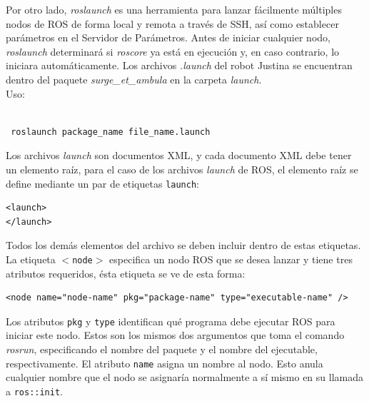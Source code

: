 \documentclass[user_manual.tex]{subfiles}
\begin{document}
Por otro lado, \textit{roslaunch} es una herramienta para lanzar fácilmente múltiples nodos de ROS de forma local y remota a través de SSH, así como establecer parámetros en el Servidor de Parámetros. Antes de iniciar cualquier nodo, \textit{roslaunch} determinará si \textit{roscore} ya está en ejecución y, en caso contrario, lo iniciara automáticamente. Los archivos \textit{.launch} del robot Justina se encuentran dentro del paquete \textit{surge\_et\_ambula} en la carpeta \textit{launch}.\\

Uso:\\\\
\begin{verbatim}
 roslaunch package_name file_name.launch
\end{verbatim}

Los archivos \textit{launch} son documentos XML, y cada documento XML debe tener un elemento raíz, para el caso de los archivos \textit{launch} de ROS, el elemento raíz se define mediante un par de etiquetas \texttt{launch}:

\begin{verbatim}
<launch>
</launch>
\end{verbatim}

Todos los demás elementos del archivo se deben incluir dentro de estas etiquetas.\\

La etiqueta \texttt{$ < $node$ > $} especifica un nodo ROS que se desea lanzar y tiene tres atributos requeridos, ésta etiqueta se ve de esta forma:

\begin{verbatim}
<node name="node-name" pkg="package-name" type="executable-name" />
\end{verbatim}

Los atributos \texttt{pkg} y \texttt{type} identifican qué programa debe ejecutar ROS para iniciar este nodo. Estos son los mismos dos argumentos que toma el comando \textit{rosrun}, especificando el nombre del paquete y el nombre del ejecutable, respectivamente. El atributo \texttt{name} asigna un nombre al nodo. Esto anula cualquier nombre que el nodo se asignaría normalmente a sí mismo en su llamada a \texttt{ros::init}.\\
\end{document}
